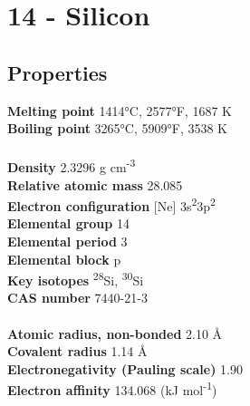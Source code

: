 \section{14 - Silicon}
\label{sec:elem-silicon}
\subsection{Properties}
\textbf{Melting point} 1414°C, 2577°F, 1687 K\\
\textbf{Boiling point} 3265°C, 5909°F, 3538 K\\
\\
\textbf{Density} 2.3296 g cm\textsuperscript{-3}\\
\textbf{Relative atomic mass} 28.085\\
\textbf{Electron configuration} [Ne] 3s\textsuperscript{2}3p\textsuperscript{2}\\
\textbf{Elemental group} 14\\
\textbf{Elemental period} 3\\
\textbf{Elemental block} p\\
\textbf{Key isotopes} \textsuperscript{28}Si, \textsuperscript{30}Si\\
\textbf{CAS number} 7440-21-3\\
\\
\textbf{Atomic radius, non-bonded} 2.10 Å\\
\textbf{Covalent radius} 1.14 Å\\
\textbf{Electronegativity (Pauling scale)} 1.90\\
\textbf{Electron affinity} 134.068 (kJ mol\textsuperscript{-1})\\